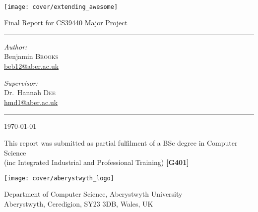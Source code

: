 \begin{titlepage}
	\begin{center}
	
	~\\
	
	\vspace{2cm}
	\texttt{[image: cover/extending\_awesome]} \\
	\vspace{2cm}
	
	{ \Large Final Report for CS39440 Major Project }
	\vspace{0.5cm}

	\hrule
	\vspace{0.25cm}
	\noindent
	\begin{minipage}[t]{0.4\textwidth}
		\begin{flushleft} \large
			\emph{Author:}\\
			Benjamin \textsc{Brooks}\\
			\href{mailto:beb12@aber.ac.uk}{beb12@aber.ac.uk}
		\end{flushleft}
	\end{minipage}%
	\begin{minipage}[t]{0.4\textwidth}
		\begin{flushright} \large
			\emph{Supervisor:} \\
			Dr.~Hannah \textsc{Dee}\\
			\href{mailto:hmd1@aber.ac.uk}{hmd1@aber.ac.uk}
		\end{flushright}
	\end{minipage}
	\vspace{0.5cm}
	\hrule
	\vspace{0.5cm}
	
	{ \Large \today }

	\vfill
	
	\vspace{1cm}
	This report was submitted as partial fulfilment of a BSc degree in Computer Science \\
	(inc Integrated Industrial and Professional Training) \textbf{[G401]}
	\vspace{1cm}
	
	\texttt{[image: cover/aberystwyth\_logo]}
	
	{ \footnotesize Department of Computer Science, Aberystwyth University } \\	
	{ \scriptsize Aberystwyth, Ceredigion, SY23 3DB, Wales, UK }
	
	\vspace{-3cm}

	\end{center}
\end{titlepage}
